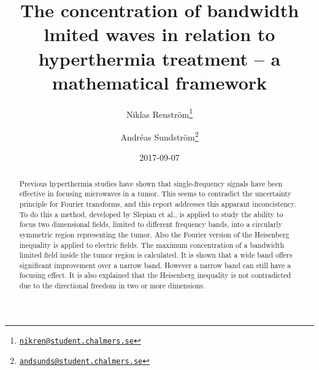 \documentclass[11pt,a4paper, 
swedish,english %
]{article}
\begin{document}


%


\begin{titlepage}
\title{The concentration of bandwidth lmited waves
in relation to hyperthermia treatment
-- a mathematical framework}
\author{Niklas Renström\footnote{\href{mailto:nikren@student.chalmers.se}{\tt nikren@student.chalmers.se}} 
\and Andréas Sundström\footnote{\href{mailto:andsunds@student.chalmers.se}{\tt andsunds@student.chalmers.se}}
}

\date{2017-09-07}%

\maketitle


\thispagestyle{empty} \pagestyle{empty} %

\begin{abstract}
Previous hyperthermia studies have shown that single-frequency signals
have been effective in focusing microwaves in a tumor. This seems to 
contradict the uncertainty principle for Fourier transforms, and this
report addresses this apparant inconcistency. To do this a method,
developed by Slepian et al., is applied to study the ability to focus
two dimensional fields, limited to different frequency bands, into a
circularly symmetric region representing the tumor. Also the Fourier 
version of the Heisenberg inequality is applied to electric fields. 
The maximum concentration of a bandwidth limited field inside the tumor 
region is calculated. It is shown that a wide band offers 
significant improvement over a narrow band. However a narrow band can 
still have a focusing effect.
It is also explained that the Heisenberg inequality is not contradicted due
to the directional freedom in two or more dimensions. 
\end{abstract}
\newpage
\tableofcontents
\end{titlepage}

\setcounter{page}{1}
\end{document}
